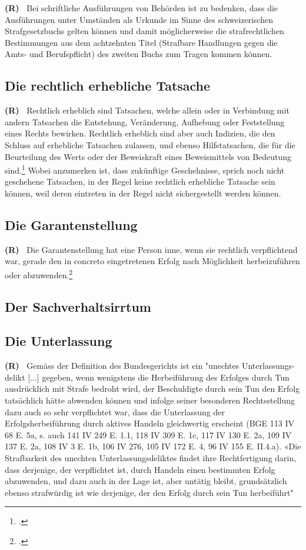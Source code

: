 \documentclass[paper=a4,fontsize=12pt, oneside, numbers=noenddot]{scrbook}
\newcounter{rz}
\newcommand{\Rz}{
	\addtocounter{rz}{1}\textbf{(R\arabic{rz})~}
}
\begin{document}
\Rz Bei schriftliche Ausführungen von Behörden ist zu bedenken, dass die Ausführungen unter Umständen als Urkunde im Sinne des schweizerischen Strafgesetzbuchs gelten können und damit möglicherweise die strafrechtlichen Bestimmungen aus dem  achtzehnten Titel (Strafbare Handlungen gegen die Amts- und Berufspflicht) des zweiten Buchs zum Tragen kommen können.

\subsection{Die rechtlich erhebliche Tatsache}\label{Recht:Tatsache}
\Rz Rechtlich erheblich sind Tatsachen, welche allein oder in Verbindung mit andern Tatsachen die Entstehung, Veränderung, Aufhebung oder Feststellung eines Rechts bewirken. Rechtlich erheblich sind aber auch Indizien, die den Schluss auf erhebliche Tatsachen zulassen, und ebenso Hilfstatsachen, die für die Beurteilung des Werts oder der Beweiskraft eines Beweismittels von Bedeutung sind.\footcite[E. 3a]{BGE113IV77} Wobei anzumerken ist, dass zukünftige Geschehnisse, sprich noch nicht geschehene Tatsachen, in der Regel keine rechtlich erhebliche Tatsache sein können, weil deren eintreten in der Regel nicht sichergestellt werden können. 

\subsection{Die Garantenstellung}\label{Recht:Garantenstellung}
\Rz Die Garantenstellung hat eine Person inne, wenn sie rechtlich verpflichtend war, gerade den in concreto eingetretenen Erfolg nach Möglichkeit herbeizuführen oder abzuwenden.\footcite[Art. 11, Rz 11]{2021:Trechsler:StGBPraxisK}  

\subsection{Der Sachverhaltsirrtum}

\subsection{Die Unterlassung}\label{Recht:Unterlassung}
\Rz Gemäss der Definition des Bundesgerichts ist ein "unechtes Unterlassungs- delikt [...] gegeben, wenn wenigstens die Herbeiführung des Erfolges durch Tun ausdrücklich mit Strafe bedroht wird, der Beschuldigte durch sein Tun den Erfolg tatsächlich hätte abwenden können und infolge seiner besonderen Rechtsstellung dazu auch so sehr verpflichtet war, dass die Unterlassung der Erfolgsherbeiführung durch aktives Handeln gleichwertig erscheint (BGE 113 IV 68 E. 5a, s. auch 141 IV 249 E. 1.1, 118 IV 309 E. 1c, 117 IV 130 E. 2a, 109 IV 137 E. 2a, 108 IV 3 E. 1b, 106 IV 276, 105 IV 172 E. 4, 96 IV 155 E. II.4.a). «Die Strafbarkeit des unechten Unterlassungsdeliktes findet ihre Rechtfertigung darin, dass derjenige, der verpflichtet ist, durch Handeln einen bestimmten Erfolg abzuwenden, und dazu auch in der Lage ist, aber untätig bleibt, grundsätzlich ebenso strafwürdig ist wie derjenige, der den Erfolg durch sein Tun herbeiführt" 
\end{document}
